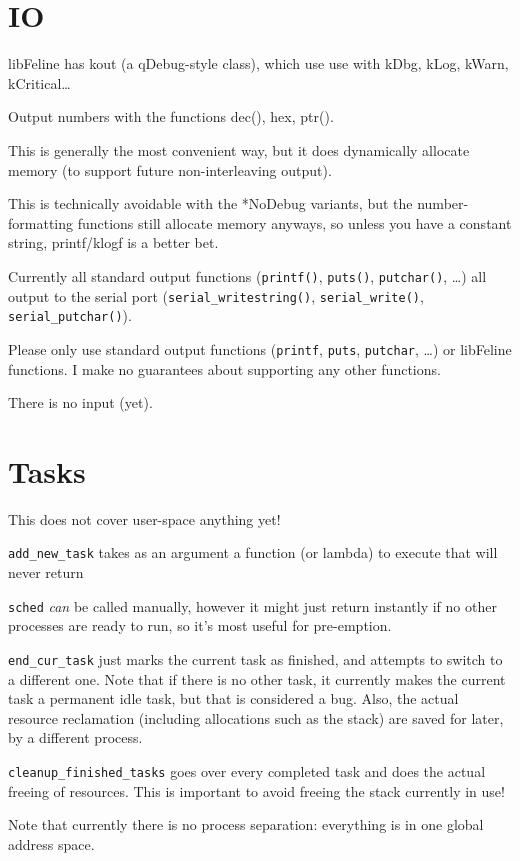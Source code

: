 \documentclass[12pt]{article}
\newcommand{\code}[1]{\colorbox{light-gray}{\texttt{#1}}}
\begin{document}
\section{IO}
\begin{list}{}{}
\item libFeline has kout (a qDebug-style class), which use use with kDbg, kLog, kWarn, kCritical…
\begin{list}{}{}
\item Output numbers with the functions dec(), hex, ptr().
\item This is generally the most convenient way, but it does dynamically allocate memory (to support future non-interleaving output).
\item This is technically avoidable with the *NoDebug variants, but the number-formatting functions still allocate memory anyways, so unless you have a constant string, printf/klogf is a better bet.
\end{list}
\item Currently all standard output functions (\code{printf()}, \code{puts()}, \code{putchar()}, \ldots) all output to the serial port (\code{serial\_writestring()}, \code{serial\_write()}, \code{serial\_putchar()}).\linebreak
\begin{list}{}{}
\item Please only use standard output functions (\code{printf}, \code{puts}, \code{putchar}, \ldots) or libFeline functions. I make no guarantees about supporting any other functions.
\end{list}
\item There is no input (yet).
\end{list}

\section{Tasks}
This does not cover user-space anything yet!
\begin{list}{}{}
\item \code{add\_new\_task} takes as an argument a function (or lambda) to execute that will never return
\item \code{sched} \textit{can} be called manually, however it might just return instantly if no other processes are ready to run, so it's most useful for pre-emption.
\item \code{end\_cur\_task} just marks the current task as finished, and attempts to switch to a different one. Note that if there is no other task, it currently makes the current task a permanent idle task, but that is considered a bug. Also, the actual resource reclamation (including allocations such as the stack) are saved for later, by a different process.
\item \code{cleanup\_finished\_tasks} goes over every completed task and does the actual freeing of resources. This is important to avoid freeing the stack currently in use!
\end{list}
Note that currently there is no process separation: everything is in one global address space.
\end{document}
